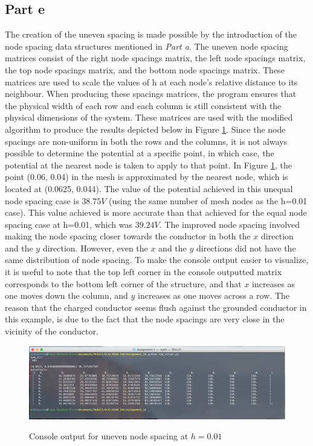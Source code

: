 \documentclass[11pt]{amsart}
\begin{document}
\subsection*{Part e}
The creation of the uneven spacing is made possible by the introduction of the node spacing data structures mentioned in \textit{Part a}. The uneven node spacing matrices consist of the right node spacings matrix, the left node spacings matrix, the top node spacings matrix, and the bottom node spacings matrix. These matrices are used to scale the values of h at each node's relative distance to its neighbour. When producing these spacings matrices, the program ensures that the physical width of each row and each column is still consistent with the physical dimensions of the system. These matrices are used with the modified algorithm to produce the results depicted below in Figure \ref{fig:uneven_spacing}. Since the node spacings are non-uniform in both the rows and the columns, it is not always possible to determine the potential at a specific point, in which case, the potential at the nearest node is taken to apply to that point. In Figure \ref{fig:uneven_spacing}, the point (0.06, 0.04) in the mesh is approximated by the nearest node, which is located at (0.0625, 0.044). The value of the potential achieved in this unequal node spacing case is $38.75V$ (using the same number of mesh nodes as the h=0.01 case). This value achieved is more accurate than that achieved for the equal node spacing case at h=0.01, which was $39.24V$. The improved node spacing involved making the node spacing closer towards the conductor in both the $x$ direction and the $y$ direction. However, even the $x$ and the $y$ directions did not have the same distribution of node spacing. To make the console output easier to visualize, it is useful to note that the top left corner in the console outputted matrix corresponds to the bottom left corner of the structure, and that $x$ increases as one moves down the column, and $y$ increases as one moves across a row. The reason that the charged conductor seems flush against the grounded conductor in this example, is due to the fact that the node spacings are very close in the vicinity of the conductor.

\begin{center}
	\begin{figure}[h]
		\caption{Console output for uneven node spacing at $h=0.01$}
		\includegraphics[width=\textwidth]{assets/uneven_spacing.png}\label{fig:uneven_spacing}
	\end{figure}
\end{center}
\end{document}
